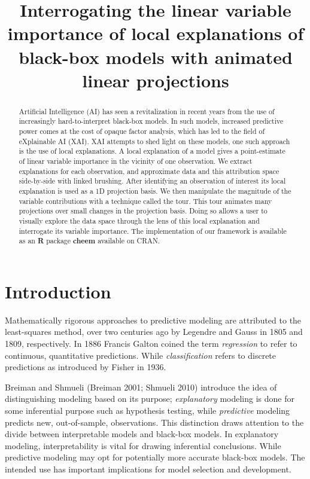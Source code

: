 \documentclass[
  article]{article}
\title{Interrogating the linear variable importance of local explanations of black-box models with animated linear projections}
\author{}
\date{\vspace{-2.5em}}
\begin{document}
\maketitle
\begin{abstract}
Artificial Intelligence (AI) has seen a revitalization in recent years from the use of increasingly hard-to-interpret black-box models. In such models, increased predictive power comes at the cost of opaque factor analysis, which has led to the field of eXplainable AI (XAI). XAI attempts to shed light on these models, one such approach is the use of local explanations. A local explanation of a model gives a point-estimate of linear variable importance in the vicinity of one observation. We extract explanations for each observation, and approximate data and this attribution space side-by-side with linked brushing. After identifying an observation of interest its local explanation is used as a 1D projection basis. We then manipulate the magnitude of the variable contributions with a technique called the tour. This tour animates many projections over small changes in the projection basis. Doing so allows a user to visually explore the data space through the lens of this local explanation and interrogate its variable importance. The implementation of our framework is available as an \textbf{R} package \textbf{cheem} available on CRAN.
\end{abstract}

\hypertarget{sec:intro}{%
\section{Introduction}\label{sec:intro}}

Mathematically rigorous approaches to predictive modeling are attributed to the least-squares method, over two centuries ago by Legendre and Gauss in 1805 and 1809, respectively. In 1886 Francis Galton coined the term \emph{regression} to refer to continuous, quantitative predictions. While \emph{classification} refers to discrete predictions as introduced by Fisher in 1936.

Breiman and Shmueli (Breiman 2001; Shmueli 2010) introduce the idea of distinguishing modeling based on its purpose; \emph{explanatory} modeling is done for some inferential purpose such as hypothesis testing, while \emph{predictive} modeling predicts new, out-of-sample, observations. This distinction draws attention to the divide between interpretable models and black-box models. In explanatory modeling, interpretability is vital for drawing inferential conclusions. While predictive modeling may opt for potentially more accurate black-box models. The intended use has important implications for model selection and development.
\end{document}
